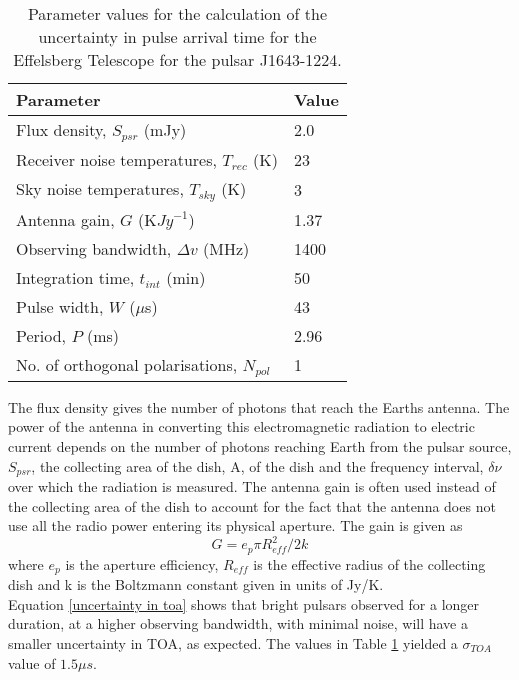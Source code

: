 \documentclass[12pt]{article}
\begin{document}
	\begin{table}[ht!]
		\centering
		\begin{tabular}{l|l}
			Parameter & Value \\\hline
			Flux density, $S_{psr}$ (mJy)& 2.0 \\
			Receiver noise temperatures, $T_{rec}$ (K) & 23\\
			Sky noise temperatures, $T_{sky}$ (K) & 3\\
			Antenna gain, $G$ (K${Jy}^{-1}$)&1.37\\
			Observing bandwidth, $\Delta{v}$ (MHz) & 1400\\
			Integration time, $t_{int}$ (min)& 50\\
			Pulse width, $W$ ($\mu$s)& 43\\
			Period, $P$ (ms) & 2.96\\
			No. of orthogonal polarisations, $N_{pol}$&1\\ 	
		\end{tabular}
		\caption{\label{tab:noise}Parameter values for the calculation of the uncertainty in pulse arrival time for the Effelsberg Telescope for the pulsar J1643-1224.}
	\end{table} 
	The flux density gives the number of photons that reach the Earths antenna. The power of the antenna in converting this electromagnetic radiation to electric current depends on the number of photons reaching Earth from the pulsar source, $S_{psr}$, the collecting area of the dish, A, of the dish and the frequency interval, $\delta \nu$ over which the radiation is measured. The antenna gain is often used instead of the collecting area of the dish to account for the fact that the antenna does not use all the radio power entering its physical aperture. The gain is given as
	\begin{equation}\label{gain}
	G=e_p \pi R_{eff}^2/2k
	\end{equation}
	where $e_p$ is the aperture efficiency, $R_{eff}$ is the effective radius of the collecting dish and k is the Boltzmann constant given in units of Jy/K.\\
	\noindent Equation \ref{uncertainty in toa} shows that bright pulsars observed for a longer duration, at a higher observing bandwidth, with minimal noise, will have a smaller uncertainty in TOA, as expected. The values in Table \ref{tab:noise} yielded a $\sigma_{TOA}$ value of $1.5 \mu s$.\\
\end{document}

